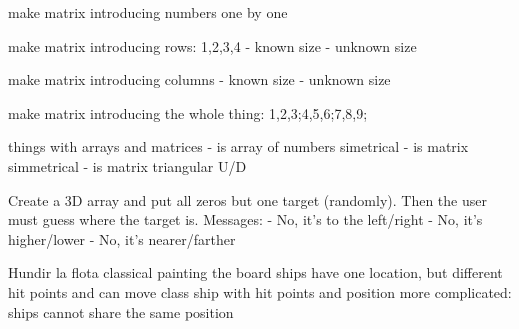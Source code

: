 

make matrix introducing numbers one by one

make matrix introducing rows: 1,2,3,4
  - known size
  - unknown size

make matrix introducing columns
  - known size
  - unknown size

make matrix introducing the whole thing: 1,2,3;4,5,6;7,8,9;



things with arrays and matrices
  - is array of numbers simetrical
  - is matrix simmetrical
  - is matrix triangular U/D

Create a 3D array and put all zeros but one target (randomly). Then the
user must guess where the target is. Messages:
  - No, it's to the left/right
  - No, it's higher/lower
  - No, it's nearer/farther

Hundir la flota
  classical
    painting the board
  ships have one location, but different hit points and can move
     class ship with hit points and position
     more complicated: ships cannot share the same position





